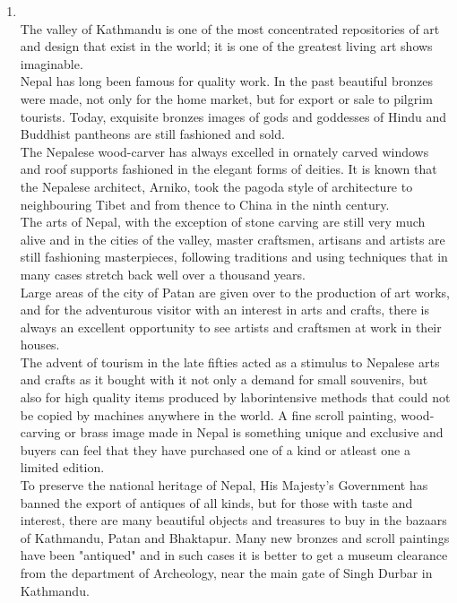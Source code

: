 \documentclass[12pt]{article}
\begin{document}
\begin{enumerate}
    \item {}\\
      The valley of Kathmandu is one of the most concentrated repositories of art and design that exist in the world; it is one of the greatest living art shows imaginable.\\

      Nepal has long been famous for quality work. In the past beautiful bronzes were made, not only for the home market, but for export or sale to pilgrim tourists. Today, exquisite bronzes images of gods and goddesses of Hindu and Buddhist pantheons are still fashioned and sold.\\

      The Nepalese wood-carver has always excelled in ornately carved windows and roof supports fashioned in the elegant forms of deities. It is known that the Nepalese architect, Arniko, took the pagoda style of architecture to neighbouring Tibet and from thence to China in the ninth century.\\

      The arts of Nepal, with the exception of stone carving are still very much alive and in the cities of the valley, master craftsmen, artisans and artists are still fashioning masterpieces, following traditions and using techniques that in many cases stretch back well over a thousand years.\\

      Large areas of the city of Patan are given over to the production of art works, and for the adventurous visitor with an interest in arts and crafts, there is always an excellent opportunity to see artists and craftsmen at work in their houses.\\

      The advent of tourism in the late fifties acted as a stimulus to Nepalese arts and crafts as it bought with it not only a demand for small souvenirs, but also for high quality items produced by laborintensive methods that could not be copied by machines anywhere in the world. A fine scroll painting, wood-carving or brass image made in Nepal is something unique and exclusive and buyers can feel that they have purchased one of a kind or atleast one a limited edition.\\

      To preserve the national heritage of Nepal, His Majesty's Government has banned the export of antiques of all kinds, but for those with taste and interest, there are many beautiful objects and treasures to buy in the bazaars of Kathmandu, Patan and Bhaktapur. Many new bronzes and scroll paintings have been "antiqued" and in such cases it is better to get a museum clearance from the department of Archeology, near the main gate of Singh Durbar in Kathmandu.\\


\end{enumerate}
\end{document}
